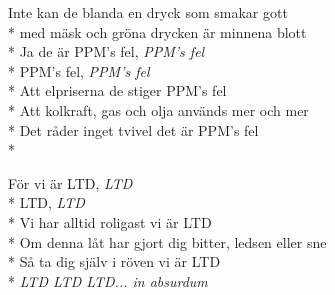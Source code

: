 \begin{SongText}
\begin{SongVerse}
        Inte kan de blanda en dryck som smakar gott\\*%
        med mäsk och gröna drycken är minnena blott\\*%
        Ja de är PPM's fel, \textit{PPM's fel}\\*%
        PPM's fel, \textit{PPM's fel}\\*%
        Att elpriserna de stiger PPM's fel\\*%
        Att kolkraft, gas och olja används mer och mer\\*%
        Det råder inget tvivel det är PPM's fel\\*%
    \end{SongVerse}
    \begin{SongVerse}
        För vi är LTD, \textit{LTD}\\*%
        LTD, \textit{LTD}\\*%
        Vi har alltid roligast vi är LTD\\*%
        Om denna låt har gjort dig bitter, ledsen eller sne\\*%
        Så ta dig själv i röven vi är LTD\\*%
        \textit{LTD LTD LTD... in absurdum}
    \end{SongVerse}
\end{SongText}


